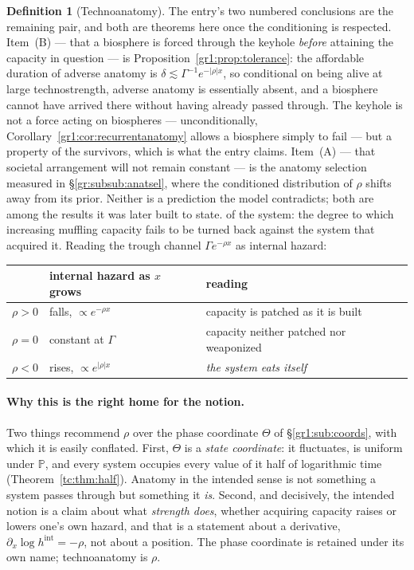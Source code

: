 \documentclass[11pt]{article}
\numberwithin{equation}{section}
\theoremstyle{plain}
\theoremstyle{definition}
\newtheorem{definition}[theorem]{Definition}
\theoremstyle{remark}
\newcommand{\PP}{\mathbb{P}}
\begin{document}
\begin{definition}[Technoanatomy]
{The entry's two numbered conclusions are the remaining pair, and both
are theorems here once the conditioning is respected. Item~(B) --- that
a biosphere is forced through the keyhole \emph{before} attaining the
capacity in question --- is
Proposition~\ref{gr1:prop:tolerance}: the affordable duration of adverse
anatomy is $\delta\lesssim\Gamma^{-1}e^{-|\rho|x}$, so conditional on
being alive at large technostrength, adverse anatomy is essentially
absent, and a biosphere cannot have arrived there without having already
passed through. The keyhole is not a force acting on biospheres --- 
unconditionally, Corollary~\ref{gr1:cor:recurrentanatomy} allows a
biosphere simply to fail --- but a property of the survivors, which is
what the entry claims. Item~(A) --- that societal arrangement will not
remain constant --- is the anatomy selection measured in
\S\ref{gr:subsub:anatsel}, where the conditioned distribution of $\rho$
shifts away from its prior. Neither is a prediction the model
contradicts; both are among the results it was later built to state.}
of the system: the
degree to which increasing muffling capacity fails to be turned back
against the system that acquired it. Reading the trough channel
$\Gamma e^{-\rho x}$ as internal hazard:
\begin{center}\small
\begin{tabular}{@{}lll@{}}
\toprule
& internal hazard as $x$ grows & reading\\
\midrule
$\rho>0$ & falls, $\propto e^{-\rho x}$ & capacity is patched as it is
built\\
$\rho=0$ & constant at $\Gamma$ & capacity neither patched nor
weaponized\\
$\rho<0$ & rises, $\propto e^{|\rho|x}$ & \emph{the system eats itself}\\
\bottomrule
\end{tabular}
\end{center}
\end{definition}

\paragraph{Why this is the right home for the notion.}\label{gr1:rem:anatomyhome}
Two things recommend $\rho$ over the phase coordinate $\Theta$ of
\S\ref{gr1:sub:coords}, with which it is easily conflated.
First, $\Theta$ is a \emph{state coordinate}: it fluctuates, is uniform
under $\PP$, and every system occupies every value of it half of
logarithmic time (Theorem~\ref{tc:thm:half}). Anatomy in the intended
sense is not something a system passes through but something it
\emph{is}. Second, and decisively, the intended notion is a claim about
what \emph{strength does}, whether acquiring capacity raises or
lowers one's own hazard, and that is a statement about a derivative,
$\partial_x\log h^{\mathrm{int}} = -\rho$, not about a position. The
phase coordinate is retained under its own name; technoanatomy is
$\rho$.
\end{document}
